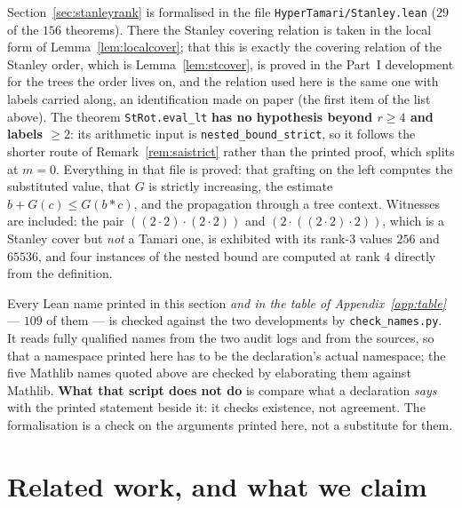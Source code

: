 \documentclass[11pt,a4paper]{article}
\theoremstyle{plain}
\theoremstyle{definition}
\begin{document}
Section~\ref{sec:stanleyrank} is formalised in the file \verb|HyperTamari/Stanley.lean|
($29$ of the $156$ theorems). There the Stanley covering relation is taken in the local
form of Lemma~\ref{lem:localcover}; that this is exactly the covering relation of the
Stanley order, which is Lemma~\ref{lem:stcover}, is proved in the Part~I development for
the trees the order lives on, and the relation used here is the same one with labels
carried along, an identification made on paper (the first item of the list above). The
theorem \verb|StRot.eval_lt| \textbf{has no hypothesis beyond
$r\ge4$ and labels $\ge2$}: its arithmetic input is \verb|nested_bound_strict|, so it
follows the shorter route of Remark~\ref{rem:saistrict} rather than the printed proof,
which splits at $m=0$. Everything in that file is proved: that grafting on the left
computes the substituted value, that $G$ is strictly increasing, the estimate
$b+G(c)\le G(b*c)$, and the propagation through a tree context. Witnesses are included:
the pair $((2\cdot2)\cdot(2\cdot2))$ and $(2\cdot((2\cdot2)\cdot2))$, which is a Stanley
cover but \emph{not} a Tamari one, is exhibited with its rank-$3$ values $256$ and
$65536$, and four instances of the nested bound are computed at rank $4$ directly from
the definition.

Every Lean name printed in this section \emph{and in the table of
Appendix~\ref{app:table}} --- $109$ of them --- is checked against the two developments by
\verb|check_names.py|. It reads fully qualified names from the two audit logs and from
the sources, so that a namespace printed here has to be the declaration's actual
namespace; the five Mathlib names quoted above are checked by elaborating them against
Mathlib. \textbf{What that script does not do} is compare what a declaration
\emph{says} with the printed statement beside it: it checks existence, not agreement.
The formalisation is a check on the arguments printed here, not a substitute for them.
\section{Related work, and what we claim}\label{sec:related}
\end{document}
